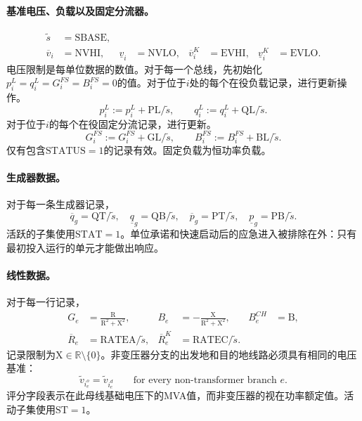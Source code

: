 \documentclass{article}
\begin{document}
\paragraph{基准电压、负载以及固定分流器。}
\begin{align*}
\widetilde s&=\mathrm{SBASE},\\
\overline v_i&=\mathrm{NVHI},&\underline v_i&=\mathrm{NVLO},&
\overline v_i^K&=\mathrm{EVHI},&\underline v_i^K&=\mathrm{EVLO}.
\end{align*}
电压限制是每单位数据的数值。对于每一个总线，先初始化$p_i^L=q_i^L=G_i^{FS}=B_i^{FS}=0$的值。对于位于$i$处的每个在役负载记录，进行更新操作。
\[
p_i^L:=p_i^L+\mathrm{PL}/\widetilde s,\qquad
q_i^L:=q_i^L+\mathrm{QL}/\widetilde s.
\]
对于位于$i$的每个在役固定分流记录，进行更新。
\[
G_i^{FS}:=G_i^{FS}+\mathrm{GL}/\widetilde s,\qquad
B_i^{FS}:=B_i^{FS}+\mathrm{BL}/\widetilde s.
\]
仅有包含$\mathrm{STATUS}=1$的记录有效。固定负载为恒功率负载。

\paragraph{生成器数据。}
对于每一条生成器记录，
\[
\overline q_g=\mathrm{QT}/\widetilde s,\quad
\underline q_g=\mathrm{QB}/\widetilde s,\quad
\overline p_g=\mathrm{PT}/\widetilde s,\quad
\underline p_g=\mathrm{PB}/\widetilde s.
\]
活跃的子集使用$\mathrm{STAT}=1$。单位承诺和快速启动后的应急进入被排除在外：只有最初投入运行的单元才能做出响应。

\paragraph{线性数据。}
对于每一行记录，
\begin{align*}
G_e&=\frac{\mathrm R}{\mathrm R^2+\mathrm X^2},&
B_e&=-\frac{\mathrm X}{\mathrm R^2+\mathrm X^2},&
B_e^{CH}&=\mathrm B,\\
\overline R_e&=\mathrm{RATEA}/\widetilde s,&
\overline R_e^K&=\mathrm{RATEC}/\widetilde s.
\end{align*}
记录限制为$\mathrm X\in\mathbb R\setminus\{0\}$。非变压器分支的出发地和目的地线路必须具有相同的电压基准：
\[
\widetilde v_{i_e^o}=\widetilde v_{i_e^d}\qquad\text{for every non-transformer branch }e.
\]
评分字段表示在此母线基础电压下的MVA值，而非变压器的视在功率额定值。活动子集使用$\mathrm{ST}=1$。
\end{document}

